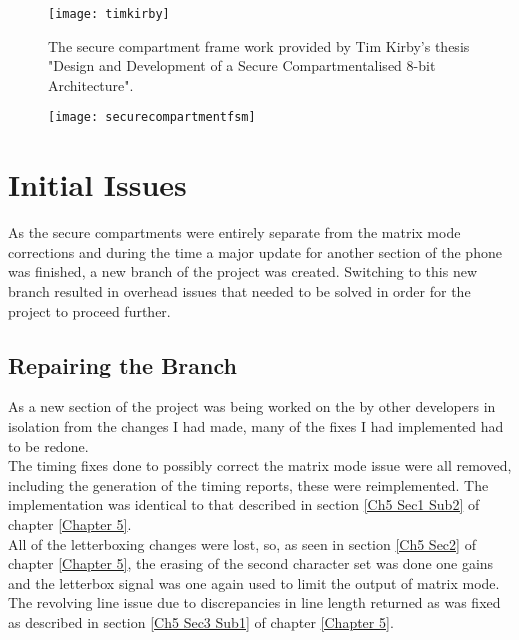 \begin{figure}
  \centering
  \texttt{[image: timkirby]}
  \caption{The secure compartment frame work provided by Tim Kirby's thesis "Design and Development of a Secure Compartmentalised 8-bit Architecture".}
  \label{fig:timkirby}
\end{figure}

\begin{figure}
  \centering
  \texttt{[image: securecompartmentfsm]}
  \caption{}
  \label{fig:securecompartmentsfsm}
\end{figure}


\section{Initial Issues}

\label{Ch6 Sec2}

As the secure compartments were entirely separate from the matrix mode corrections and during the time a major update for another section of the phone was finished, a new branch of the project was created. Switching to this new branch resulted in overhead issues that needed to be solved in order for the project to proceed further.

\subsection{Repairing the Branch}

\label{Ch6 Sec2 Sub1}

As a new section of the project was being worked on the by other developers in isolation from the changes I had made, many of the fixes I had implemented had to be redone.\\
The timing fixes done to possibly correct the matrix mode issue were all removed, including the generation of the timing reports, these were reimplemented. The implementation was identical to that described in section \ref{Ch5 Sec1 Sub2} of chapter \ref{Chapter 5}.\\
All of the letterboxing changes were lost, so, as seen in section \ref{Ch5 Sec2} of chapter \ref{Chapter 5}, the erasing of the second character set was done one gains and the letterbox signal was one again used to limit the output of matrix mode.\\
The revolving line issue due to discrepancies in line length returned as was fixed as described in section \ref{Ch5 Sec3 Sub1} of chapter \ref{Chapter 5}.\\

